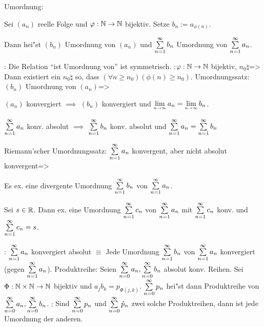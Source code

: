  Umordnung:{
  Sei $(a_n)$ reelle Folge und $\varphi:\mathbb N\to\mathbb N$ bijektiv.
  Setze $b_n:=a_{\phi(n)}$.
  
  Dann hei"st $(b_n)$ Umordnung von $(a_n)$ und 
  $\sumn 1 b_n$ Umordnung von $\sumn 1 a_n$.
  }
\remark:{
  Die Relation ``ist Umordnung von'' ist symmetrisch.
  }
\lessertheorem:$\varphi:\mathbb N\to\mathbb N$ bijektiv, $n_0\natural$=>{
  Dann existiert ein $n_0\natural$ so, dass 
  $(\forall n\ge n_0)(\phi(n)\ge n_0)$.
  }
\theorem Umordnungssatz:
  $(b_n)$ Umordnung von $(a_n)$=>{
  \begin{stmts}
    \item $(a_n)$ konvergiert $\implies$ $(b_n)$ konvergiert und
      $\limn a_n=\limn b_n$.
    \item $\sumn 1 a_n$ konv. absolut $\implies$
      $\sumn 1 b_n$ konv. absolut und $\sumn 1 a_n=\sumn 1 b_n$
    \end{stmts}
  }
\lessertheorem Riemann'scher Umordnungssatz:
 $\sumn 1 a_n$ konvergent, aber nicht absolut konvergent=>{
 \begin{stmts}
   \item Es ex. eine divergente Umordnung $\sumn 1 b_n$ von $\sumn 1 a_n$.
   \item Sei $s\in\mathbb R$. Dann ex. eine Umordnung $\sumn 1 c_n$ von $\sumn 1 a_n$ mit 
     $\sumn 1 c_n$ konv. und $\sumn 1 c_n=s$.
   \end{stmts}
 }
\remark:{
  $\sumn 1 a_n$ konvergiert absolut $\equiv$ Jede Umordnung $\sumn 1 b_n$ von
  $\sumn 1 a_n$ konvergiert (gegen $\sumn 1 a_n$).
}
 Produktreihe:{
  Seien $\sumn 0 a_n,\sumn 0 b_n$ absolut konv. Reihen. Sei
  $\Phi:\mathbb N\times\mathbb N\to\mathbb N$ bijektiv und $a_j b_k =p_{\Phi(j,k)}$.
  $\sumn 0 p_n$ hei"st dann Produktreihe von $\sumn 0 a_n,\sumn 0 b_n$.
}
\remark:{
  Sind $\sumn 0 p_n$ und $\sumn 0 \tilde p_n$ zwei solche Produktreihen,
  dann ist jede Umordnung der anderen.
}
